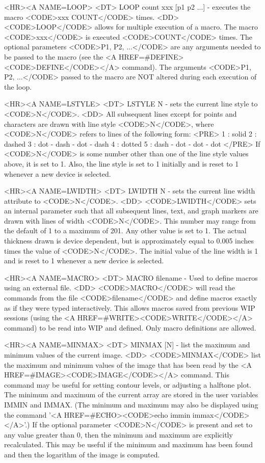 \begin{rawhtml}
<HR><A NAME=LOOP>
<DT>
LOOP count xxx [p1 p2 ...] - executes the macro <CODE>xxx COUNT</CODE> times.
<DD>
	<CODE>LOOP</CODE> allows for multiple execution of a macro.
	The macro <CODE>xxx</CODE> is executed <CODE>COUNT</CODE> times.
	The optional parameters <CODE>P1, P2, ...</CODE>
	are any arguments needed to be passed to the macro (see the
	<A HREF=#DEFINE><CODE>DEFINE</CODE></A> command).  The arguments
	<CODE>P1, P2, ...</CODE> passed to the macro are NOT altered
	during each execution of the loop.

<HR><A NAME=LSTYLE>
<DT>
LSTYLE N - sets the current line style to <CODE>N</CODE>.
<DD>
	All subsequent lines except for points and characters are drawn
	with line style <CODE>N</CODE>, where <CODE>N</CODE> refers to
	lines of the following form:
	<PRE>
    1 : solid
    2 : dashed
    3 : dot - dash - dot - dash
    4 : dotted
    5 : dash - dot - dot - dot
	</PRE>
	If <CODE>N</CODE> is some number other than one of the line style
	values above, it is set to 1.  Also, the line style is set to 1
	initially and is reset to 1 whenever a new device is selected.

<HR><A NAME=LWIDTH>
<DT>
LWIDTH N - sets the current line width attribute to <CODE>N</CODE>.
<DD>
	<CODE>LWIDTH</CODE> sets an internal parameter such that all
	subsequent lines, text, and graph markers are drawn with lines
	of width <CODE>N</CODE>.  This number may range from the default
	of 1 to a maximum of 201.  Any other value is set to 1.  The
	actual thickness drawn is device dependent, but is approximately
	equal to 0.005 inches times the value of <CODE>N</CODE>.  The
	initial value of the line width is 1 and is reset to 1 whenever
	a new device is selected.

<HR><A NAME=MACRO>
<DT>
MACRO filename - Used to define macros using an external file.
<DD>
	<CODE>MACRO</CODE> will read the commands from the file
	<CODE>filename</CODE> and define macros exactly as if they were
	typed interactively.  This allows macros saved from previous WIP
	sessions (using the <A HREF=#WRITE><CODE>WRITE</CODE></A> command)
	to be read into WIP and defined.  Only macro definitions are allowed.

<HR><A NAME=MINMAX>
<DT>
MINMAX [N] - list the maximum and minimum values of the current image.
<DD>
	<CODE>MINMAX</CODE> list the maximum and minimum values of the
	image that has been read by the <A HREF=#IMAGE><CODE>IMAGE</CODE></A>
	command.  This command may be useful for setting contour levels,
	or adjusting a halftone plot.  The minimum and maximum of the
	current array are stored in the user variables IMMIN and IMMAX.
	(The minimum and maximum may also be displayed using the command
	'<A HREF=#ECHO><CODE>echo immin immax</CODE></A>'.)  If the
	optional parameter <CODE>N</CODE> is present and set to any value
	greater than 0, then the minimum and maximum are explicitly
	recalculated.  This may be useful if the minimum and maximum has
	been found and then the logarithm of the image is computed.


\end{rawhtml}
